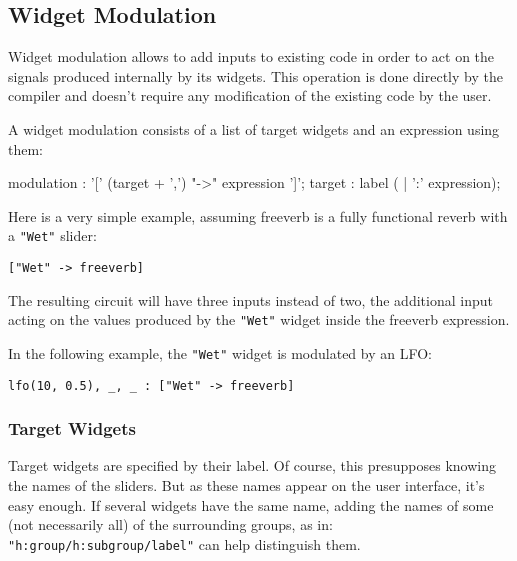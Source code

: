
\subsection{Widget Modulation}

Widget modulation allows to add inputs to existing code in order to act on the signals produced internally by its widgets. This operation is done directly by the compiler and doesn't require any modification of the existing code by the user.

A widget modulation consists of a list of target widgets and an expression using them:

\begin{rail}
	modulation : '[' (target + ',') "->" expression ']';
	target : label ( | ':' expression);
\end{rail}
	

Here is a very simple example, assuming freeverb is a fully functional reverb with a \lstinline'"Wet"' slider:

\begin{lstlisting}
["Wet" -> freeverb]
\end{lstlisting}

The resulting circuit will have three inputs instead of two, the additional input acting on the values produced by the \lstinline'"Wet"' widget inside the freeverb expression.

In the following example, the \lstinline'"Wet"' widget is modulated by an LFO:

\begin{lstlisting}
lfo(10, 0.5), _, _ : ["Wet" -> freeverb]
\end{lstlisting}

\subsubsection{Target Widgets}

Target widgets are specified by their label. Of course, this presupposes knowing the names of the sliders. But as these names appear on the user interface, it's easy enough. If several widgets have the same name, adding the names of some (not necessarily all) of the surrounding groups, as in: \lstinline`"h:group/h:subgroup/label"` can help distinguish them. 

